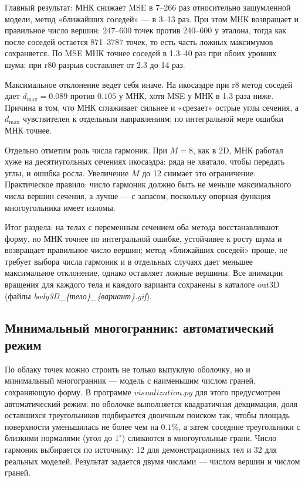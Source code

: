 \documentclass[12pt, a4paper]{article}
\begin{document}
Главный результат: МНК снижает MSE в 7--266 раз относительно зашумленной модели, метод «ближайших соседей» --- в 3--13 раз. При этом МНК возвращает и правильное число вершин: 247--600 точек против 240--600 у эталона, тогда как после соседей остается 871--3787 точек, то есть часть ложных максимумов сохраняется. По MSE МНК точнее соседей в 1.3--40 раз при обоих уровнях шума; при r80 разрыв составляет от 2.3 до 14 раз.

Максимальное отклонение ведет себя иначе. На икосаэдре при r8 метод соседей дает $d_{\max}=0.089$ против $0.105$ у МНК, хотя MSE у МНК в 1.3 раза ниже. Причина в том, что МНК сглаживает сильнее и «срезает» острые углы сечения, а $d_{\max}$ чувствителен к отдельным направлениям; по интегральной мере ошибки МНК точнее.

Отдельно отметим роль числа гармоник. При $M=8$, как в 2D, МНК работал хуже на десятиугольных сечениях икосаэдра: ряда не хватало, чтобы передать углы, и ошибка росла. Увеличение $M$ до 12 снимает это ограничение. Практическое правило: число гармоник должно быть не меньше максимального числа вершин сечения, а лучше --- с запасом, поскольку опорная функция многоугольника имеет изломы.

Итог раздела: на телах с переменным сечением оба метода восстанавливают форму, но МНК точнее по интегральной ошибке, устойчивее к росту шума и возвращает правильное число вершин; метод «ближайших соседей» проще, не требует выбора числа гармоник и в отдельных случаях дает меньшее максимальное отклонение, однако оставляет ложные вершины. Все анимации вращения для каждого тела и каждого варианта сохранены в каталоге out3D (файлы \textit{body3D\_\{тело\}\_\{вариант\}.gif}).

\subsection{Минимальный многогранник: автоматический режим}

По облаку точек можно строить не только выпуклую оболочку, но и минимальный многогранник --- модель с наименьшим числом граней, сохраняющую форму. В программе $visualization.py$ для этого предусмотрен автоматический режим: по оболочке выполняется квадратичная декцимация, доля оставшихся треугольников подбирается двоичным поиском так, чтобы площадь поверхности уменьшилась не более чем на $0.1\%$, а затем соседние треугольники с близкими нормалями (угол до $1^\circ$) сливаются в многоугольные грани. Число гармоник выбирается по источнику: 12 для демонстрационных тел и 32 для реальных моделей. Результат задается двумя числами --- числом вершин и числом граней.
\end{document}
